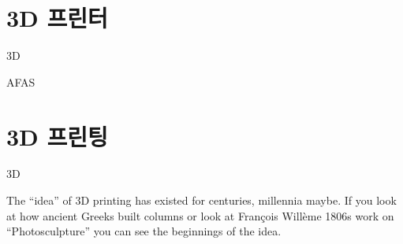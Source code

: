 
\section{3D 프린터}

\begin{frame}{3D}

AFAS

\end{frame}


\section{3D 프린팅}

\begin{frame}{3D}
\begin{block}{}
		The “idea” of 3D printing has existed for centuries, millennia maybe.  If you look at how ancient Greeks built columns or look at François Willème 1806s work on “Photosculpture” you can see the beginnings of the idea. 
	
\end{block}
\end{frame}

